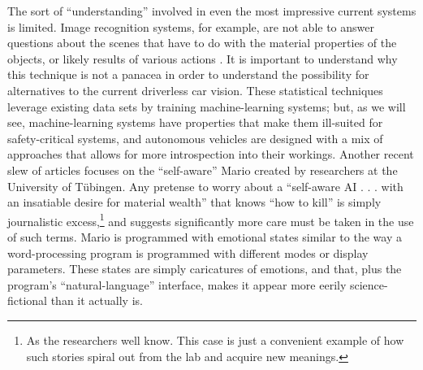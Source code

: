 The sort of ``understanding''
involved in even the most impressive current systems is limited. Image
recognition systems, for example, are not
able to answer questions about the scenes that have to do with
the material properties of the objects, or likely results of various
actions \cite{gomesJordan}. It is important to understand why this technique is not a
panacea in order to understand the possibility for alternatives to the current
driverless car vision. These statistical techniques leverage existing data
sets by training machine-learning systems; but, as we will see,
machine-learning systems have properties that make them ill-suited for
safety-critical systems, and autonomous vehicles are designed with a
mix of approaches that allows for more introspection into their
workings. Another recent slew of articles focuses on
the ``self-aware'' Mario created by researchers at the University of
T\"{u}bingen. Any pretense to worry about a ``self-aware AI . . . with
an insatiable desire for material wealth'' that knows ``how to kill'' \cite{vincentMario}
is simply journalistic excess,\footnote{As the
  researchers well know. This case is just a convenient example of how
such stories spiral out from the lab and acquire new meanings.} and suggests
significantly more care must be taken in the use of such terms. Mario
is programmed with emotional states similar to the way a word-processing program is
programmed with different modes or display parameters. These states
are simply caricatures of emotions, and that, plus the program's
``natural-language'' interface, makes it appear more eerily
science-fictional than it actually is.

